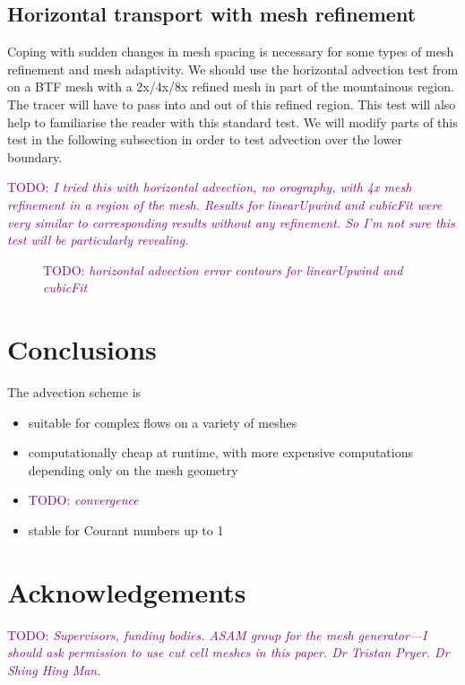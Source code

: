 \documentclass[times]{elsarticle}
\newcommand{\TODO}[1]{\textcolor{purple}{TODO: \emph{#1}}}
\begin{document}
\subsection{Horizontal transport with mesh refinement}
Coping with sudden changes in mesh spacing is necessary for some types of mesh refinement and mesh adaptivity.  We should use the horizontal advection test from \citet{schaer2002} on a BTF mesh with a 2x/4x/8x refined mesh in part of the mountainous region.  The tracer will have to pass into and out of this refined region.  This test will also help to familiarise the reader with this standard test.  We will modify parts of this test in the following subsection in order to test advection over the lower boundary.

\TODO{I tried this with horizontal advection, no orography, with 4x mesh refinement in a region of the mesh.  Results for linearUpwind and cubicFit were very similar to corresponding results without any refinement.  So I'm not sure this test will be particularly revealing.}

\begin{figure}
	\caption{\TODO{horizontal advection error contours for linearUpwind and cubicFit}}
\end{figure}





\section{Conclusions}

The advection scheme is
\begin{itemize}
	\item suitable for complex flows on a variety of meshes
	\item computationally cheap at runtime, with more expensive computations depending only on the mesh geometry
	\item \TODO{convergence}
	\item stable for Courant numbers up to 1
\end{itemize}

\section{Acknowledgements}
\TODO{Supervisors, funding bodies.  ASAM group for the mesh generator---I should ask permission to use cut cell meshes in this paper.  Dr Tristan Pryer.  Dr Shing Hing Man.}





\end{document}

